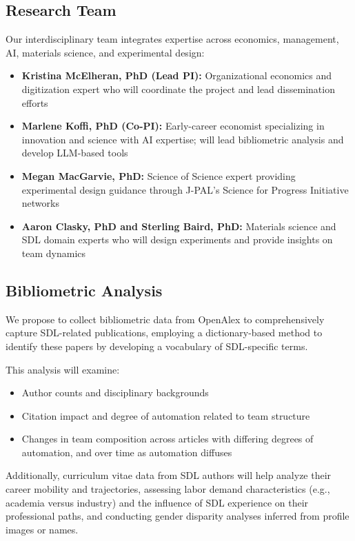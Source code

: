 \documentclass[11pt,letterpaper,twocolumn]{article}
\begin{document}
\subsection{Research Team}
Our interdisciplinary team integrates expertise across economics, management, AI, materials science, and experimental design:
\begin{itemize}
    \item \textbf{Kristina McElheran, PhD (Lead PI):} Organizational economics and digitization expert who will coordinate the project and lead dissemination efforts
    \item \textbf{Marlene Koffi, PhD (Co-PI):} Early-career economist specializing in innovation and science with AI expertise; will lead bibliometric analysis and develop LLM-based tools
    \item \textbf{Megan MacGarvie, PhD:} Science of Science expert providing experimental design guidance through J-PAL's Science for Progress Initiative networks
    \item \textbf{Aaron Clasky, PhD and Sterling Baird, PhD:} Materials science and SDL domain experts who will design experiments and provide insights on team dynamics
\end{itemize}

\subsection{Bibliometric Analysis}
We propose to collect bibliometric data from OpenAlex to comprehensively capture SDL-related publications, employing a dictionary-based method to identify these papers by developing a vocabulary of SDL-specific terms.


This analysis will examine:
\begin{itemize}
    \item Author counts and disciplinary backgrounds
    \item Citation impact and degree of automation related to team structure
    \item Changes in team composition across articles with differing degrees of automation, and over time as automation diffuses
    \end{itemize}
Additionally, curriculum vitae data from SDL authors will help analyze their career mobility and trajectories, assessing labor demand characteristics (e.g., academia versus industry) and the influence of SDL experience on their professional paths, and conducting gender disparity analyses inferred from profile images or names. 
\end{document}
